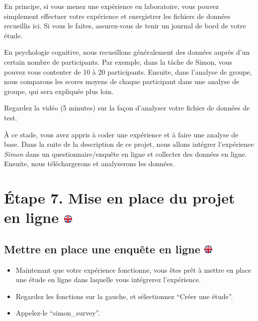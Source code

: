 \documentclass[
]{book}
\providecommand{\tightlist}{%
  \setlength{\itemsep}{0pt}\setlength{\parskip}{0pt}}
\begin{document}
En principe, si vous menez une expérience en laboratoire, vous pouvez
simplement effectuer votre expérience et enregistrer les fichiers de
données recueillis ici. Si vous le faites, assurez-vous de tenir un
journal de bord de votre étude.

En psychologie cognitive, nous recueillons généralement des données
auprès d'un certain nombre de participants. Par exemple, dans la tâche
de Simon, vous pouvez vous contenter de 10 à 20 participants. Ensuite,
dans l'analyse de groupe, nous comparons les scores moyens de chaque
participant dans une analyse de groupe, qui sera expliquée plus loin.

Regardez la vidéo (5 minutes) sur la façon d'analyser votre fichier de
données de test.

À ce stade, vous avez appris à coder une expérience et à faire une
analyse de base. Dans la suite de la description de ce projet, nous
allons intégrer l'expérience \emph{Simon} dans un questionnaire/enquête
en ligne et collecter des données en ligne. Ensuite, nous téléchargerons
et analyserons les données.

\hypertarget{uxe9tape-7.-mise-en-place-du-projet-en-ligne}{%
\section[Étape 7. Mise en place du projet en ligne
]{\texorpdfstring{Étape 7. Mise en place du projet en ligne
\href{https://www.psytoolkit.org/lessons/project.html\#_step_7_setup_online_project}{\protect\includegraphics{img/ukflag.png}}}{Étape 7. Mise en place du projet en ligne }}\label{uxe9tape-7.-mise-en-place-du-projet-en-ligne}}

\hypertarget{mettre-en-place-une-enquuxeate-en-ligne}{%
\subsection[Mettre en place une enquête en ligne
]{\texorpdfstring{Mettre en place une enquête en ligne
\href{https://www.psytoolkit.org/lessons/project.html\#_setup_an_online_survey}{\protect\includegraphics{img/ukflag.png}}}{Mettre en place une enquête en ligne }}\label{mettre-en-place-une-enquuxeate-en-ligne}}

\begin{itemize}
\tightlist
\item
  Maintenant que votre expérience fonctionne, vous êtes prêt à mettre en
  place une étude en ligne dans laquelle vous intégrerez l'expérience.
\item
  Regardez les fonctions sur la gauche, et sélectionnez ``Créer une
  étude''.
\item
  Appelez-le ``simon\_survey''.
\end{itemize}
\end{document}
